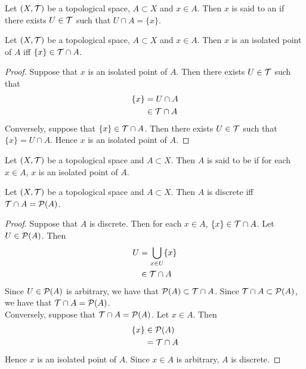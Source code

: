 \documentclass{book}
\begin{document}
\begin{defn}
	Let $(X, \mathcal{T})$ be a topological space, $A \subset X$ and $x \in A$. Then $x$ is said to an  if there exists $U \in \mathcal{T}$ such that $U \cap A = \{x\}$. 
\end{defn}

\begin{ex}
	Let $(X, \mathcal{T})$ be a topological space, $A \subset X$ and $x \in A$. Then $x$ is an isolated point of $A$ iff $\{x\} \in \mathcal{T} \cap A$.
\end{ex}

\begin{proof}
	Suppose that $x$ is an isolated point of $A$. Then there exists $U \in \mathcal{T}$ such that 
	\begin{align*}
		\{x\}
		& = U \cap A \\
		& \in \mathcal{T} \cap A
	\end{align*} 
	Conversely, suppose that $\{x\} \in \mathcal{T} \cap A$. Then there exists $U \in \mathcal{T}$ such that $\{x\} = U \cap A$. Hence $x$ is an isolated point of $A$.
\end{proof}

\begin{defn}
	Let $(X, \mathcal{T})$ be a topological space and $A \subset X$. Then $A$ is said to be  if for each $x \in A$, $x$ is an isolated point of $A$.
\end{defn}

\begin{ex}
	Let $(X, \mathcal{T})$ be a topological space and $A \subset X$. Then $A$ is discrete iff $\mathcal{T} \cap A = \mathcal{P}(A)$. 
\end{ex}

\begin{proof}
	Suppose that $A$ is discrete. Then for each $x \in A$, $\{x\} \in \mathcal{T} \cap A$. Let $U \in \mathcal{P}(A)$. Then 
	\begin{align*}
		U
		& = \bigcup_{x \in U} \{x\} \\
		& \in \mathcal{T} \cap A
	\end{align*}
	Since $U \in \mathcal{P}(A)$ is arbitrary, we have that $\mathcal{P}(A) \subset \mathcal{T} \cap A$. Since $\mathcal{T} \cap A \subset \mathcal{P}(A)$, we have that $\mathcal{T} \cap A = \mathcal{P}(A)$. \\
	Conversely, suppose that $\mathcal{T} \cap A = \mathcal{P}(A)$. Let $x \in A$. Then
	\begin{align*}
		\{x\}
		& \in \mathcal{P}(A) \\
		& = \mathcal{T} \cap A
	\end{align*}	
	Hence $x$ is an isolated point of $A$. Since $x \in A$ is arbitrary, $A$ is discrete.
\end{proof}
\end{document}
